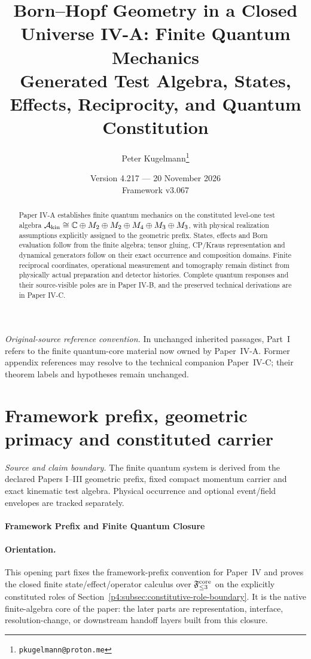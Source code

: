 \documentclass[12pt,a4paper]{article}
\title{\textbf{Born--Hopf Geometry in a Closed Universe IV-A: Finite Quantum Mechanics} \\[0.5em]\large Generated Test Algebra, States, Effects, Reciprocity, and Quantum Constitution}
\author{Peter Kugelmann\thanks{\texttt{pkugelmann@proton.me}}}
\date{Version 4.217 --- 20 November 2026 \\ Framework v3.067}
\begin{document}
\maketitle
\begin{abstract}
Paper IV-A establishes finite quantum mechanics on the constituted level-one test algebra $\mathcal A_{\rm kin}\cong\mathbb C\oplus M_2\oplus M_2\oplus M_4\oplus M_3\oplus M_3$, with physical realization assumptions explicitly assigned to the geometric prefix. States, effects and Born evaluation follow from the finite algebra; tensor gluing, CP/Kraus representation and dynamical generators follow on their exact occurrence and composition domains. Finite reciprocal coordinates, operational measurement and tomography remain distinct from physically actual preparation and detector histories. Complete quantum responses and their source-visible poles are in Paper IV-B, and the preserved technical derivations are in Paper IV-C.
\end{abstract}
\setcounter{tocdepth}{2}
\tableofcontents
\clearpage
\noindent\textit{Original-source reference convention.} In unchanged inherited passages, Part~I refers to the finite quantum-core material now owned by Paper~IV-A. Former appendix references may resolve to the technical companion Paper~IV-C; their theorem labels and hypotheses remain unchanged.

\section{Framework prefix, geometric primacy and constituted carrier}
\label{p4a:sec:v238-a1}
\noindent\textit{Source and claim boundary.} The finite quantum system is derived from the declared Papers I--III geometric prefix, fixed compact momentum carrier and exact kinematic test algebra. Physical occurrence and optional event/field envelopes are tracked separately.

\paragraph{Framework Prefix and Finite Quantum Closure}
\label{p4:part:closed-qm}

\paragraph{Orientation.}
This opening part fixes the framework-prefix convention for Paper~IV and
proves the closed finite state/effect/operator calculus over
\(\mathfrak F_{\le3}^{\rm core}\) on the explicitly constituted roles of
Section~\ref{p4:subsec:constitutive-role-boundary}.  It is the native finite-algebra core of
the paper: the later parts are representation, interface, resolution-change,
or downstream handoff layers built from this closure.
\end{document}

